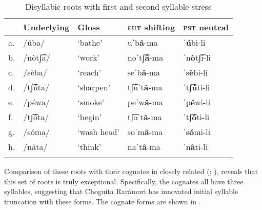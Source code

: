 \begin{table}
\caption{Disyllabic roots with first and second syllable stress}
\label{tab:exceptional-disyllabic}

\begin{tabularx}{\textwidth}{lXXXl}
\lsptoprule
&\textbf{Underlying} & \textbf{Gloss} & \textbf{\textsc{fut} shifting} & \textbf{\textsc{pst} neutral} \\
\midrule
a.& /úba/  & ‘bathe’   &  uˈb\textbf{â}{}-ma  & \textbf{ˈú}bi-li \\
b.& /nòtʃ͡a/&  ‘work' &    noˈtʃ͡\textbf{â}{}-ma &  ˈn\textbf{ò}tʃ͡i-li   \\
c.& /sèba/  & ‘reach’ & seˈb\textbf{â}-ma & ˈs\textbf{è}bi-li    \\
d.& /tʃ͡úta/&  ‘sharpen’ &  tʃ͡uˈt\textbf{â}{}-ma &  ˈtʃ͡\textbf{ú}ti-li \\
e.& /péwa/  & ‘smoke’  & peˈw\textbf{â}{}-ma  &ˈp\textbf{é}wi-li    \\
f.& /tʃ͡ôta/&  ‘begin' &  tʃ͡oˈt\textbf{â}{}-ma & ˈtʃ͡\textbf{ô}ti-li    \\
g.& /sóma/  & `wash head’   & soˈm\textbf{â}-ma  & ˈs\textbf{ó}mi-li   \\
h.& /nâta/  & ‘think’  &  naˈt\textbf{â}{}-ma & ˈn\textbf{â}ti-li   \\
\lspbottomrule
\end{tabularx}
\end{table}

Comparison of these roots with their cognates in closely related  (; \citealt{miller1996guarijio}), reveals that this set of roots is truly exceptional. Specifically, the  cognates all have three syllables, suggesting that Choguita Rarámuri has innovated initial syllable truncation with these forms. The cognate forms are shown in .

